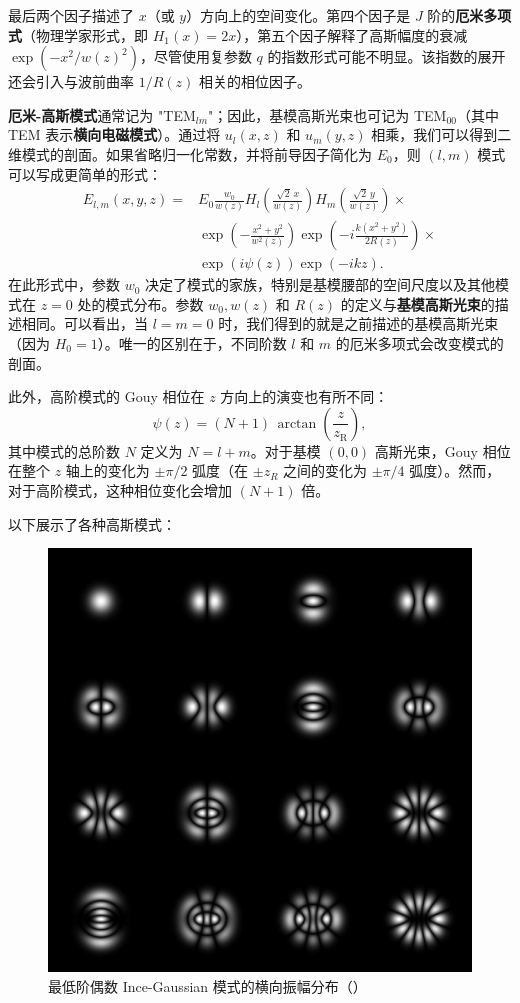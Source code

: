 \begin{enumerate}
\begin{enumerate}
		最后两个因子描述了 $x$（或 $y$）方向上的空间变化。第四个因子是 $J$ 阶的\textbf{厄米多项式}（物理学家形式，即 $H_1(x) = 2x$），第五个因子解释了高斯幅度的衰减 $\exp(-x^2/w(z)^2)$，尽管使用复参数 $q$ 的指数形式可能不明显。该指数的展开还会引入与波前曲率 $1/R(z)$ 相关的相位因子。
		
		\textbf{厄米-高斯模式}通常记为 "TEM$_{lm}$"；因此，基模高斯光束也可记为 TEM$_{00}$（其中 TEM 表示\textbf{横向电磁模式}）。通过将 $u_l(x, z)$ 和 $u_m(y, z)$ 相乘，我们可以得到二维模式的剖面。如果省略归一化常数，并将前导因子简化为 $E_0$，则 $(l, m)$ 模式可以写成更简单的形式：
		\[
		\begin{aligned}
			E_{l, m}(x, y, z) ={} & E_0 \frac{w_0}{w(z)} H_l\left(\frac{\sqrt{2} \, x}{w(z)}\right) H_m\left(\frac{\sqrt{2} \, y}{w(z)}\right) \times {} \\
			& \exp\left(-\frac{x^2 + y^2}{w^2(z)}\right) \exp\left(-i \frac{k (x^2 + y^2)}{2 R(z)}\right) \times {} \\
			& \exp\left(i \psi(z)\right) \exp(-ikz).
		\end{aligned}
		\]
		在此形式中，参数 $w_0$ 决定了模式的家族，特别是基模腰部的空间尺度以及其他模式在 $z = 0$ 处的模式分布。参数 $w_0, w(z)$ 和 $R(z)$ 的定义与\textbf{基模高斯光束}的描述相同。可以看出，当 $l = m = 0$ 时，我们得到的就是之前描述的基模高斯光束（因为 $H_0 = 1$）。唯一的区别在于，不同阶数 $l$ 和 $m$ 的厄米多项式会改变模式的剖面。
		
		此外，高阶模式的 Gouy 相位在 $z$ 方向上的演变也有所不同：
		\[
		\psi(z) = (N + 1) \, \arctan\left(\frac{z}{z_\mathrm{R}}\right),
		\]
		其中模式的总阶数 $N$ 定义为 $N = l + m$。对于基模 $(0, 0)$ 高斯光束，Gouy 相位在整个 $z$ 轴上的变化为 $\pm\pi/2$ 弧度（在 $\pm z_R$ 之间的变化为 $\pm\pi/4$ 弧度）。然而，对于高阶模式，这种相位变化会增加 $(N + 1)$ 倍。
		
		以下展示了各种高斯模式：
		
		\begin{figure}[htbp]
			\centering
			\includegraphics[width=0.35\linewidth]{images/APL1_8_Ince_Gaussian_Modes}
			\caption{最低阶偶数 Ince-Gaussian 模式的横向振幅分布（\cite{a}）}
			\label{fig:apl18incegaussianmodes}
		\end{figure}
		

\end{enumerate}
\end{enumerate}
